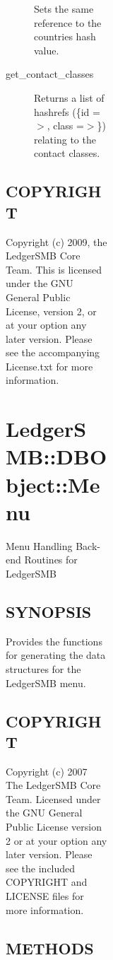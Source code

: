\begin{description}
\begin{description}
\begin{description}
\begin{description}
\begin{description}
\begin{description}
\begin{description}
\begin{description}
\begin{description}
\begin{description}
Sets the same reference to the countries hash value.


\item[{get\_contact\_classes}] \mbox{}

Returns a list of hashrefs (\{id =$>$, class =$>$\}) relating to the contact classes.

\end{description}
\subsection*{COPYRIGHT\label{LedgerSMB::DBObject::Admin_COPYRIGHT}}


Copyright (c) 2009, the LedgerSMB Core Team.  This is licensed under the GNU 
General Public License, version 2, or at your option any later version.  Please 
see the accompanying License.txt for more information.

\section{LedgerSMB::DBObject::Menu\label{LedgerSMB::DBObject::Menu}}


Menu Handling Back-end Routines for LedgerSMB

\subsection*{SYNOPSIS\label{LedgerSMB::DBObject::Menu_SYNOPSIS}}


Provides the functions for generating the data structures for the LedgerSMB
menu.

\subsection*{COPYRIGHT\label{LedgerSMB::DBObject::Menu_COPYRIGHT}}


Copyright (c) 2007 The LedgerSMB Core Team.  Licensed under the GNU General 
Public License version 2 or at your option any later version.  Please see the
included COPYRIGHT and LICENSE files for more information.

\subsection*{METHODS\label{LedgerSMB::DBObject::Menu_METHODS}}
\begin{description}


\end{description}
\end{description}
\end{description}
\end{description}
\end{description}
\end{description}
\end{description}
\end{description}
\end{description}
\end{description}
